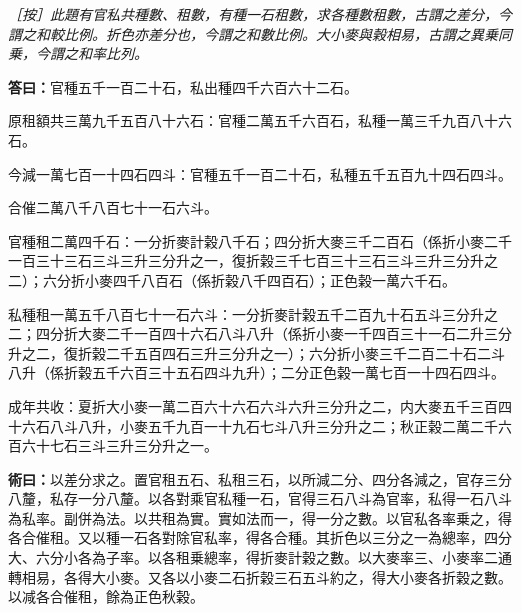 \documentclass[11pt,a4paper]{article}
\newcommand{\Answer}[1]{\par\noindent\textbf{\color{answercolor}答曰：}#1\par}
\newcommand{\Method}[1]{\par\noindent\textbf{\color{methodcolor}術曰：}#1\par}
\newcommand{\EditorialNote}[1]{\par\noindent\textit{［按］#1}\par}
\begin{document}
\EditorialNote{此題有官私共種數、租數，有種一石租數，求各種數租數，古謂之差分，今謂之和較比例。折色亦差分也，今謂之和數比例。大小麥與榖相易，古謂之異乗同乗，今謂之和率比列。}

\Answer{官種五千一百二十石，私出種四千六百六十二石。

原租額共三萬九千五百八十六石：官種二萬五千六百石，私種一萬三千九百八十六石。

今減一萬七百一十四石四斗：官種五千一百二十石，私種五千五百九十四石四斗。

合催二萬八千八百七十一石六斗。

官種租二萬四千石：一分折麥計榖八千石；四分折大麥三千二百石（係折小麥二千一百三十三石三斗三升三分升之一，復折榖三千七百三十三石三斗三升三分升之二）；六分折小麥四千八百石（係折榖八千四百石）；正色榖一萬六千石。

私種租一萬五千八百七十一石六斗：一分折麥計榖五千二百九十石五斗三分升之二；四分折大麥二千一百四十六石八斗八升（係折小麥一千四百三十一石二升三分升之二，復折榖二千五百四石三升三分升之一）；六分折小麥三千二百二十石二斗八升（係折榖五千六百三十五石四斗九升）；二分正色榖一萬七百一十四石四斗。

成年共收：夏折大小麥一萬二百六十六石六斗六升三分升之二，内大麥五千三百四十六石八斗八升，小麥五千九百一十九石七斗八升三分升之二；秋正榖二萬二千六百六十七石三斗三升三分升之一。}

\Method{以差分求之。置官租五石、私租三石，以所減二分、四分各減之，官存三分八釐，私存一分八釐。以各對乘官私種一石，官得三石八斗為官率，私得一石八斗為私率。副併為法。以共租為實。實如法而一，得一分之數。以官私各率乗之，得各合催租。又以種一石各對除官私率，得各合種。其折色以三分之一為總率，四分大、六分小各為子率。以各租乗總率，得折麥計榖之數。以大麥率三、小麥率二通轉相易，各得大小麥。又各以小麥二石折榖三石五斗約之，得大小麥各折榖之數。以减各合催租，餘為正色秋榖。}
\end{document}
